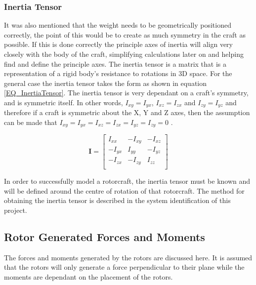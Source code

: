 		\subsubsection{Inertia Tensor}
		It was also mentioned that the weight needs to be geometrically positioned correctly, the point of this would be to create as much symmetry in the craft as possible. If this is done correctly the principle axes of inertia will align very closely with the body of the craft, simplifying calculations later on and helping find and define the principle axes. The inertia tensor is a matrix that is a representation of a rigid body's resistance to rotations in 3D space. For the general case the inertia tensor takes the form as shown in equation \eqref{EQ_InertiaTensor}. The inertia tensor is very dependant on a craft's symmetry, and is symmetric itself. In other words, $I_{xy} = I_{yx}$, $I_{xz} = I_{zx}$ and $I_{zy} = I_{yz}$ and therefore if a craft is symmetric about the X, Y and Z axes, then the assumption can be made that $I_{xy} = I_{yx} = I_{xz} = I_{zx} = I_{yz} = I_{zy} = 0$ \cite{Luukkonen, MiniFlying}.
		
		\begin{equation}
		\label{EQ_InertiaTensor}
		\textbf{I} = 
		\begin{bmatrix}
		I_{xx}	& -I_{xy} & -I_{xz}\\
		-I_{yx}	& I_{yy}	& -I_{yz}\\
		-I_{zx}	& -I_{zy}	& I_{zz}\\
		\end{bmatrix}
		\end{equation}
		
		In order to successfully model a rotorcraft, the inertia tensor must be known and will be defined around the centre of rotation of that rotorcraft. The method for obtaining the inertia tensor is described in the system identification of this project.
		
	\subsection{Rotor Generated Forces and Moments}\label{SSECT_RotorForcesMoments}
	The forces and moments generated by the rotors are discussed here. It is assumed that the rotors will only generate a force perpendicular to their plane while the moments are dependant on the placement of the rotors.
	
